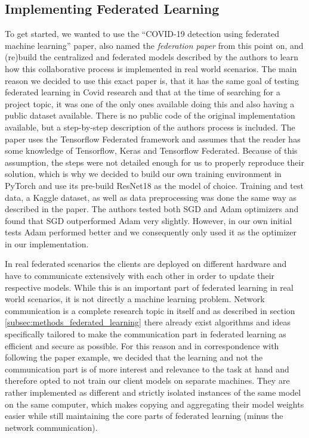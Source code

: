 \subsection{Implementing Federated Learning}\label{subsec:methods_original_paper}
To get started, we wanted to use the \enquote{COVID-19 detection using federated machine learning} paper\cite{federated_machine_learning}, also named the \textit{federation paper} from this point on, and (re)build the centralized and federated models described by the authors to learn how this collaborative process is implemented in real world scenarios. The main reason we decided to use this exact paper is, that it has the same goal of testing federated learning in Covid research and that at the time of searching for a project topic, it was one of the only ones available doing this and also having a public dataset available.
There is no public code of the original implementation available, but a step-by-step description of the authors process is included. The paper uses the Tensorflow Federated framework\cite{tensorflow_federated} and assumes that the reader has some knowledge of Tensorflow, Keras and Tensorflow Federated. Because of this assumption, the steps were not detailed enough for us to properly reproduce their solution, which is why we decided to build our own training environment in PyTorch and use its pre-build ResNet18 as the model of choice. Training and test data, a Kaggle dataset\cite{}, as well as data preprocessing was done the same way as described in the paper. The authors tested both SGD and Adam optimizers and found that SGD outperformed Adam very slightly. However, in our own initial tests Adam performed better and we consequently only used it as the optimizer in our implementation.

In real federated scenarios the clients are deployed on different hardware and have to communicate extensively with each other in order to update their respective models. While this is an important part of federated learning in real world scenarios, it is not directly a machine learning problem. Network communication is a complete research topic in itself and as described in section \ref{subsec:methods_federated_learning} there already exist algorithms and ideas specifically tailored to make the communication part in federated learning as efficient and secure as possible. For this reason and in correspondence with following the paper example, we decided that the learning and not the communication part is of more interest and relevance to the task at hand and therefore opted to not train our client models on separate machines. They are rather implemented as different and strictly isolated instances of the same model on the same computer, which makes copying and aggregating their model weights easier while still maintaining the core parts of federated learning (minus the network communication).

